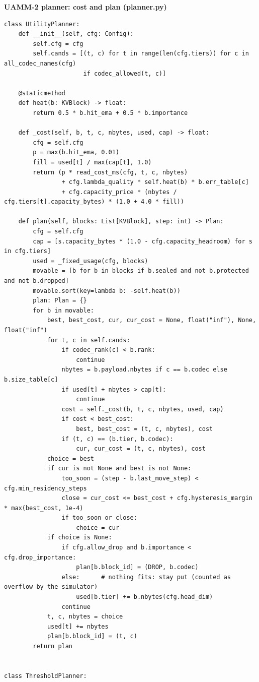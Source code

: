 \documentclass[12pt,a4paper]{report}
\begin{document}
\par\smallskip\noindent\textbf{UAMM-2 planner: cost and plan (planner.py)}\par\nopagebreak
\begin{lstlisting}
class UtilityPlanner:
    def __init__(self, cfg: Config):
        self.cfg = cfg
        self.cands = [(t, c) for t in range(len(cfg.tiers)) for c in all_codec_names(cfg)
                      if codec_allowed(t, c)]

    @staticmethod
    def heat(b: KVBlock) -> float:
        return 0.5 * b.hit_ema + 0.5 * b.importance

    def _cost(self, b, t, c, nbytes, used, cap) -> float:
        cfg = self.cfg
        p = max(b.hit_ema, 0.01)
        fill = used[t] / max(cap[t], 1.0)
        return (p * read_cost_ms(cfg, t, c, nbytes)
                + cfg.lambda_quality * self.heat(b) * b.err_table[c]
                + cfg.capacity_price * (nbytes / cfg.tiers[t].capacity_bytes) * (1.0 + 4.0 * fill))

    def plan(self, blocks: List[KVBlock], step: int) -> Plan:
        cfg = self.cfg
        cap = [s.capacity_bytes * (1.0 - cfg.capacity_headroom) for s in cfg.tiers]
        used = _fixed_usage(cfg, blocks)
        movable = [b for b in blocks if b.sealed and not b.protected and not b.dropped]
        movable.sort(key=lambda b: -self.heat(b))
        plan: Plan = {}
        for b in movable:
            best, best_cost, cur, cur_cost = None, float("inf"), None, float("inf")
            for t, c in self.cands:
                if codec_rank(c) < b.rank:
                    continue
                nbytes = b.payload.nbytes if c == b.codec else b.size_table[c]
                if used[t] + nbytes > cap[t]:
                    continue
                cost = self._cost(b, t, c, nbytes, used, cap)
                if cost < best_cost:
                    best, best_cost = (t, c, nbytes), cost
                if (t, c) == (b.tier, b.codec):
                    cur, cur_cost = (t, c, nbytes), cost
            choice = best
            if cur is not None and best is not None:
                too_soon = (step - b.last_move_step) < cfg.min_residency_steps
                close = cur_cost <= best_cost + cfg.hysteresis_margin * max(best_cost, 1e-4)
                if too_soon or close:
                    choice = cur
            if choice is None:
                if cfg.allow_drop and b.importance < cfg.drop_importance:
                    plan[b.block_id] = (DROP, b.codec)
                else:      # nothing fits: stay put (counted as overflow by the simulator)
                    used[b.tier] += b.nbytes(cfg.head_dim)
                continue
            t, c, nbytes = choice
            used[t] += nbytes
            plan[b.block_id] = (t, c)
        return plan


class ThresholdPlanner:
\end{lstlisting}
\end{document}
